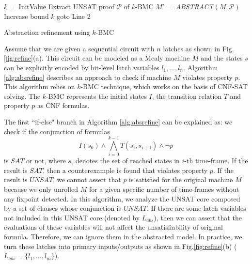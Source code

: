 \begin{algorithm}[hbt]
\SetAlgoNoLine
  $k = $ InitValue\;
  {
  }
  {
	Extract UNSAT proof $\mathcal P$ of $k$-BMC\;
	$M' = $ \textit{ABSTRACT}$(M,\mathcal P)$\;
  }
  {
  }
  {
	Increase bound $k$\;
	goto Line 2\;
  }
\caption {Abstraction refinement using $k$-BMC}\label{alg:absrefine}
\end{algorithm}
\begin{figure}[hbt]
\end{figure}
Assume that we are given a sequential circuit with $n$ latches as shown in Fig.\ref{fig:refine}(a). 
This circuit can be modeled as a Mealy machine $M$ and the states $s$ can be explicitly encoded by bit-level latch variables 
$l_1,\dots,l_n$. Algorithm \ref{alg:absrefine} describes an approach to check if machine $M$ violates property $p$.
This algorithm relies on $k$-BMC technique, which works on the basis of CNF-SAT solving.
The $k$-BMC represents the initial states $I$, the transition relation $T$ and property $p$ as CNF formulas.

The first ``if-else" branch in Algorithm \ref{alg:absrefine} can be
explained as: we check if the conjunction of formulas 
$$I(s_0)\land \bigwedge_{i=0}^{k-1}T(s_i,s_{i+1}) \land \neg p$$
is $SAT$ or not, where $s_i$ denotes the set of reached states in $i$-th time-frame. If the result is
$SAT$, then a counterexample is found that violates property $p$. If the result is $UNSAT$, we cannot
assert that $p$ is satisfied for the original machine $M$ because we only unrolled $M$ for a given specific number of time-frames
without any fixpoint detected.
In this algorithm, we analyze the UNSAT core composed by a set of clauses whose conjunction is $UNSAT$.
If there are some latch variables not included in this UNSAT core (denoted by $L_{abs}$), then we can assert that the evaluations of 
these variables will not affect the unsatisfiability of original formula. Therefore, we can ignore them in the abstracted model.
In practice, we turn these latches into primary inputs/outputs as shown in Fig.\ref{fig:refine}(b) ($L_{abs} = \{l_1,\dots,l_m\}$).


